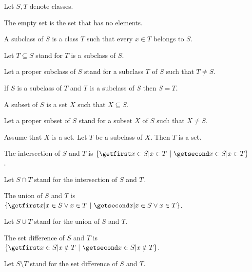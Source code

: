\documentclass[11pt]{article}
\begin{document}
\begin{forthel}
  Let $S, T$ denote classes.

  \begin{definition}
    The empty set is the set that has no elements.
  \end{definition}

  \begin{definition}
    A subclass of $S$ is a class $T$ such that every $x \in T$ belongs to $S$.
  \end{definition}

  Let $T \subseteq S$ stand for $T$ is a subclass of $S$.

  Let a proper subclass of $S$ stand for a subclass $T$ of $S$ such that $T \neq
  S$.

  \begin{lemma}
    If $S$ is a subclass of $T$ and $T$ is a subclass of $S$ then $S = T$.
  \end{lemma}

  \begin{definition}
    A subset of $S$ is a set $X$ such that $X \subseteq S$.
  \end{definition}

  Let a proper subset of $S$ stand for a subset $X$ of $S$ such that $X \neq S$.

  \begin{axiom}
    Assume that $X$ is a set.
    Let $T$ be a subclass of $X$.
    Then $T$ is a set.
  \end{axiom}

  \begin{definition}
    The intersection of $S$ and $T$ is $\class{x \in S | x \in T}$.
  \end{definition}

  Let $S \cap T$ stand for the intersection of $S$ and $T$.

  \begin{definition}
    The union of $S$ and $T$ is $\class{x | x \in S \vee x \in T}$.
  \end{definition}

  Let $S \cup T$ stand for the union of $S$ and $T$.

  \begin{definition}
    The set difference of $S$ and $T$ is $\class{x \in S | x \notin T}$.
  \end{definition}

  Let $S \setminus T$ stand for the set difference of $S$ and $T$.


\end{forthel}
\end{document}
